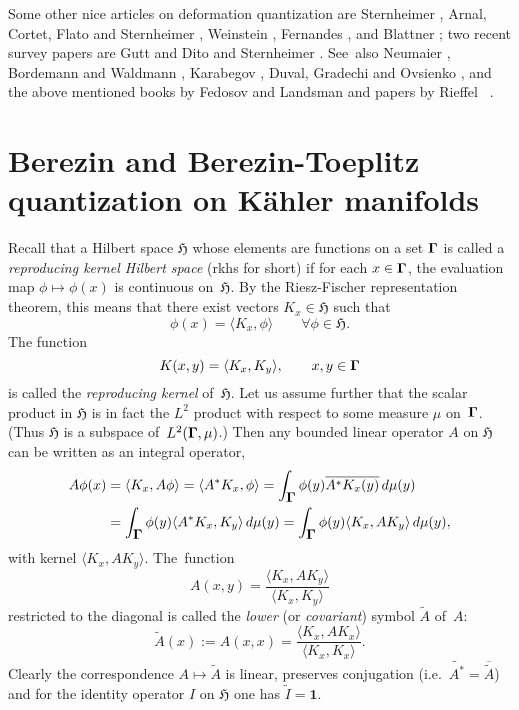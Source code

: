 \documentclass[11pt]{amsart}
\numberwithin{equation}{section}
\theoremstyle{remark}
\let\boldkey\mathbf \let\bold\mathbf
\newcommand\spr[2]{\langle #1,#2\rangle}
\newcommand\into{\int_\Omg}
\newcommand\jedna{{\boldkey1}}
\newcommand\Omg{{\bigam}}   %
\newcommand\HH{\mathfrak H}
\newcommand{\bigam}{\mbox{\boldmath $\Gamma$}}
\begin{document}
Some other nice articles on deformation quantization are Sternheimer
\cite{bib:Stw}, Arnal, Cortet, Flato and Sternheimer \cite{bib:ACFS}, Weinstein
\cite{bib:WeinAst}, Fernandes \cite{bib:Fern}, and Blattner \cite{bib:Blatt};
two recent survey papers are Gutt \cite{bib:GuttV} and Dito and Sternheimer
\cite{bib:DiSt}. See~also Neumaier \cite{bib:Neumai}, Bordemann and Waldmann
\cite{bib:BoWa}, Karabegov \cite{bib:KarC} \cite{bib:KarD}, Duval, Gradechi
and Ovsienko \cite{bib:+DuGrOv}, and the above mentioned books by Fedosov
\cite{bib:FedosBk} and Landsman \cite{bib:LandsBk} and papers by Rieffel
\cite{bib:RiefB}~\cite{bib:Rief}.


\section{Berezin and Berezin-Toeplitz quantization on K\"ahler manifolds}
\label{sec4}
Recall that a Hilbert space $\HH$ whose elements are functions on a set $\Omg$
is called a {\sl reproducing kernel Hilbert space\/} (rkhs for short) if for
each $x\in\Omg$, the evaluation map $\phi\mapsto\phi(x)$ is continuous
on~$\HH$. By the Riesz-Fischer representation theorem, this means that there
exist vectors $K_x\in \HH$ such that
$$ \phi(x) = \spr {K_x}\phi \qquad \forall \phi\in \HH.  $$
The function
$$ K(x,y)=\spr{K_x}{K_y}, \qquad x,y\in\Omg $$
is called the {\sl reproducing kernel\/} of~$\HH$. Let us assume further that
the scalar product in $\HH$ is in fact the $L^2$ product with respect to some
measure $\mu$ on~$\Omg$. (Thus $\HH$ is a subspace of~$L^2(\Omg,\mu)$.) Then
any bounded linear operator $A$ on $\HH$ can be written as an integral
operator,
\begin{align*}   A\phi(x)
& = \spr{K_x}{A\phi} =\spr{A^*K_x} {\phi}= \into \phi(y) \overline{A^*K_x(y)}
\,d\mu(y) \\
& = \into \phi(y) \spr{A^*K_x}{K_y} \, d\mu(y) =
\into \phi(y) \spr {K_x}{AK_y} \,d\mu(y) ,  \end{align*}
with kernel $\spr {K_x}{AK_y}$. The~function
\begin{equation}  A(x,y) = \frac{\spr {K_x}{AK_y}}{\spr{K_x}{K_y}}
\label{tag:Bses}  \end{equation}
restricted to the diagonal is called the {\sl lower\/} (or {\sl covariant\/})
symbol $\tilde A$ of~$A$:
\begin{equation}  \tilde A(x) :=A(x,x) =
\frac{\spr{K_x}{AK_x}}{\spr{K_x}{K_x}}. \label{tag:Bsr}  \end{equation}
Clearly the correspondence $A\mapsto\tilde A$ is linear, preserves conjugation
(i.e.~$\widetilde{A^*}=\overline{\tilde A}$) and for the identity operator $I$
on $\HH$ one has $\tilde I=\jedna$.
\end{document}
